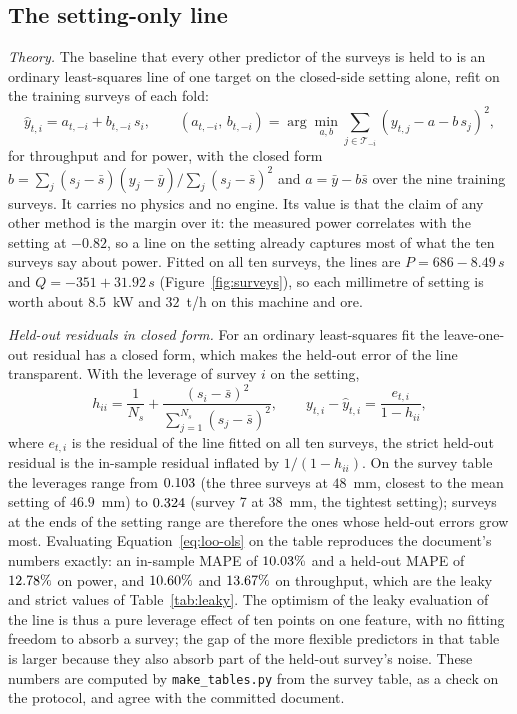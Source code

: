 \subsection{The setting-only line}\label{sec:m-line}

\emph{Theory.} The baseline that every other predictor of the surveys is held to is an ordinary least-squares line of one target on the
closed-side setting alone, refit on the training surveys of each fold:
\begin{equation}
\hat y_{t,i} = a_{t,-i} + b_{t,-i}\,s_i,\qquad
\left(a_{t,-i},\,b_{t,-i}\right) = \arg\min_{a,b}\sum_{j\in\mathcal T_{-i}}\left(y_{t,j} - a - b\,s_j\right)^2 ,
\label{eq:line}
\end{equation}
for throughput and for power, with the closed form $b=\sum_j(s_j-\bar s)(y_j-\bar y)/\sum_j(s_j-\bar s)^2$ and $a=\bar y-b\bar s$ over the nine
training surveys. It carries no physics and no engine. Its value is that the claim of any other method is the margin over it: the measured power
correlates with the setting at $-0.82$, so a line on the setting already captures most of what the ten surveys say about power. Fitted on all ten
surveys, the lines are $P = 686 - 8.49\,s$ and $Q = -351 + 31.92\,s$ (Figure~\ref{fig:surveys}), so each millimetre of setting is worth about
$8.5$~kW and $32$~t/h on this machine and ore.

\emph{Held-out residuals in closed form.} For an ordinary least-squares fit the leave-one-out residual has a closed form, which makes
the held-out error of the line transparent. With the leverage of survey $i$ on the setting,
\begin{equation}
h_{ii} = \frac{1}{N_s} + \frac{(s_i-\bar s)^2}{\sum_{j=1}^{N_s}(s_j-\bar s)^2},\qquad
y_{t,i}-\hat y_{t,i} = \frac{e_{t,i}}{1-h_{ii}},
\label{eq:loo-ols}
\end{equation}
where $e_{t,i}$ is the residual of the line fitted on all ten surveys, the strict held-out residual is the in-sample residual inflated by
$1/(1-h_{ii})$. On the survey table the leverages range from $0.103$ (the three surveys at $48$~mm, closest to the mean setting of $46.9$~mm) to
$0.324$ (survey 7 at $38$~mm, the tightest setting); surveys at the ends of the setting range are therefore the ones whose held-out errors grow
most. Evaluating Equation~\eqref{eq:loo-ols} on the table reproduces the document's numbers exactly: an in-sample MAPE of $10.03\%$ and a held-out
MAPE of $12.78\%$ on power, and $10.60\%$ and $13.67\%$ on throughput, which are the leaky and strict values of Table~\ref{tab:leaky}. The
optimism of the leaky evaluation of the line is thus a pure leverage effect of ten points on one feature, with no fitting freedom to absorb a
survey; the gap of the more flexible predictors in that table is larger because they also absorb part of the held-out survey's noise. These
numbers are computed by \texttt{make\_tables.py} from the survey table, as a check on the protocol, and agree with the committed document.

